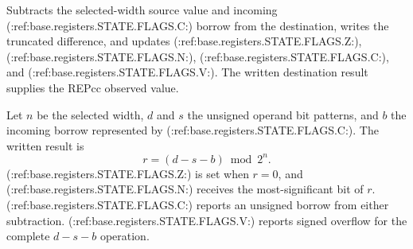 Subtracts the selected-width source value and incoming (:ref:base.registers.STATE.FLAGS.C:) borrow from the destination, writes the truncated difference, and updates (:ref:base.registers.STATE.FLAGS.Z:), (:ref:base.registers.STATE.FLAGS.N:), (:ref:base.registers.STATE.FLAGS.C:), and (:ref:base.registers.STATE.FLAGS.V:). The written destination result supplies the REPcc observed value.

Let \(n\) be the selected width, \(d\) and \(s\) the unsigned operand bit patterns, and \(b\) the incoming borrow represented by (:ref:base.registers.STATE.FLAGS.C:). The written result is
\[
  r = (d - s - b) \bmod 2^n .
\]
(:ref:base.registers.STATE.FLAGS.Z:) is set when \(r=0\), and (:ref:base.registers.STATE.FLAGS.N:) receives the most-significant bit of \(r\). (:ref:base.registers.STATE.FLAGS.C:) reports an unsigned borrow from either subtraction. (:ref:base.registers.STATE.FLAGS.V:) reports signed overflow for the complete \(d-s-b\) operation.
